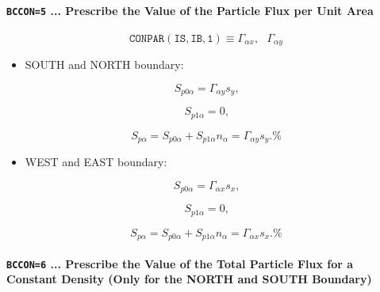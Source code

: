 \documentclass[11pt]{article}
\begin{document}
\bigskip

\paragraph{\texttt{BCCON=5} ... Prescribe the Value of the Particle Flux per
Unit Area}

\bigskip

\begin{equation*}
\mathtt{CONPAR(IS,IB,1)}\equiv\Gamma_{\alpha x},\text{ }\Gamma_{\alpha y}
\end{equation*}

\bigskip

\begin{itemize}
\item  SOUTH and NORTH boundary:
\end{itemize}

\begin{equation}
S_{p0\alpha}=\Gamma_{\alpha y}s_{y}\text{,}   \label{c36}
\end{equation}

\begin{equation}
S_{p1\alpha}=0\text{,}   \label{c37}
\end{equation}

\begin{equation}
S_{p\alpha}=S_{p0\alpha}+S_{p1\alpha}n_{\alpha}=\Gamma_{\alpha y}s_{y}\text{.%
}   \label{c38}
\end{equation}

\begin{itemize}
\item  WEST and EAST boundary:
\end{itemize}

\begin{equation}
S_{p0\alpha}=\Gamma_{\alpha x}s_{x}\text{,}   \label{c39}
\end{equation}

\begin{equation}
S_{p1\alpha}=0\text{,}   \label{c40}
\end{equation}

\begin{equation}
S_{p\alpha}=S_{p0\alpha}+S_{p1\alpha}n_{\alpha}=\Gamma_{\alpha x}s_{x}\text{.%
}   \label{c41}
\end{equation}

\bigskip

\paragraph{\texttt{BCCON=6} ... Prescribe the Value of the Total Particle
Flux for a Constant Density (Only for the NORTH and SOUTH Boundary)}
\end{document}
